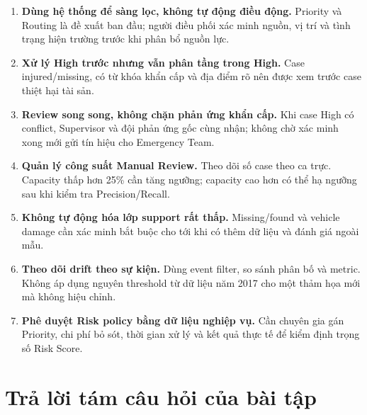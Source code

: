 \begin{enumerate}[leftmargin=*]
  \item \textbf{Dùng hệ thống để sàng lọc, không tự động điều động.}
        Priority và Routing là đề xuất ban đầu; người điều phối xác minh nguồn,
        vị trí và tình trạng hiện trường trước khi phân bổ nguồn lực.
  \item \textbf{Xử lý High trước nhưng vẫn phân tầng trong High.}
        Case injured/missing, có từ khóa khẩn cấp và địa điểm rõ nên được xem
        trước case thiệt hại tài sản.
  \item \textbf{Review song song, không chặn phản ứng khẩn cấp.}
        Khi case High có conflict, Supervisor và đội phản ứng gốc cùng nhận;
        không chờ xác minh xong mới gửi tín hiệu cho Emergency Team.
  \item \textbf{Quản lý công suất Manual Review.}
        Theo dõi số case theo ca trực. Capacity thấp hơn 25\% cần tăng ngưỡng;
        capacity cao hơn có thể hạ ngưỡng sau khi kiểm tra Precision/Recall.
  \item \textbf{Không tự động hóa lớp support rất thấp.}
        Missing/found và vehicle damage cần xác minh bắt buộc cho tới khi có
        thêm dữ liệu và đánh giá ngoài mẫu.
  \item \textbf{Theo dõi drift theo sự kiện.}
        Dùng event filter, so sánh phân bố và metric. Không áp dụng nguyên
        threshold từ dữ liệu năm 2017 cho một thảm họa mới mà không hiệu chỉnh.
  \item \textbf{Phê duyệt Risk policy bằng dữ liệu nghiệp vụ.}
        Cần chuyên gia gán Priority, chi phí bỏ sót, thời gian xử lý và kết quả
        thực tế để kiểm định trọng số Risk Score.
\end{enumerate}

\section{Trả lời tám câu hỏi của bài tập}

